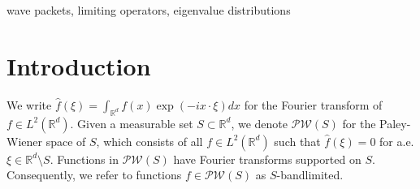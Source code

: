 \documentclass[conference]{IEEEtran}
\def\R{\mathbb{R}}
\numberwithin{equation}{section}
\newcommand{\KH}[1]{{\color{blue}KH: #1}}
\newcommand{\AM}[1]{{\color{purple}AM: #1}}
\newcommand{\AI}[1]{{\color{red}AI: #1}}
\newcommand{\Z}{\mathbb Z}
\newcommand{\N}{\mathbb N}
\newcommand{\cV}{\mathcal V}
\newcommand{\cW}{\mathcal W}
\newcommand{\cJ}{\mathcal J}
\newcommand{\cB}{\mathcal B}
\newcommand{\cK}{\mathcal K}
\newcommand{\cH}{\mathcal H}
\newcommand{\cL}{\mathcal L}
\newcommand{\cM}{\mathcal M}
\newcommand{\cI}{\mathcal I}
\newcommand{\cN}{\mathcal N}
\newcommand{\cE}{\mathcal E}
\newcommand{\cT}{\mathcal T}
\newcommand{\cQ}{\mathcal Q}
\newcommand{\cS}{\mathcal S}
\newcommand{\cF}{\mathcal F}
\newcommand{\bL}{\mathbf L}
\newcommand{\bk}{\mathbf k}
\newcommand{\supp}{\mathrm{supp}}
\newcommand{\dist}{\mathrm{dist}}
\newcommand{\diam}{\mathrm{diam}}
\newcommand{\tr}{\mathrm{tr}}
\newcommand{\op}{\mathrm{op}}
\def\R{\mathbb{R}}
\begin{document}








 

\maketitle
 

\begin{abstract} 
We discuss the design of ``wave packet systems'' that admit strong concentration properties in phase space. We make a connection between this problem and topics in signal processing related to the spectral behavior of spatial and frequency-limiting operators. The results have engineering applications in medical imaging, geophysics, and astronomy. 
\end{abstract}

 
\begin{IEEEkeywords}
wave packets,   limiting operators, eigenvalue distributions
\end{IEEEkeywords}

 
\section{Introduction}

We write $\widehat{f}(\xi) = \int_{\R^d} f(x) \exp(- i x\cdot\xi ) dx$ for the Fourier transform of $f \in L^2(\R^d)$.  
%
Given a measurable set $S \subset \R^d$, we denote $\mathcal{PW}(S)$ for the Paley-Wiener space of $S$, which consists of all $f \in L^2(\R^d)$ such that $\widehat{f}(\xi) = 0$ for a.e. $\xi \in \R^d \setminus S$. Functions in $\mathcal{PW}(S)$ have  Fourier transforms supported on $S$. Consequently, we refer to functions $f \in \mathcal{PW}(S)$ as $S$-bandlimited.
\end{document}
